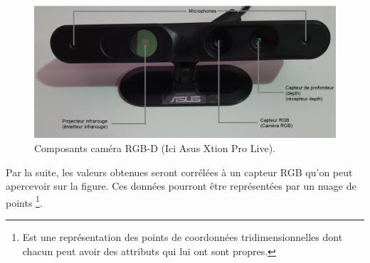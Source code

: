 \documentclass[a4paper, 12pt]{book}
\begin{document}
\begin{figure}[htbp]
  \hspace{-0.75cm}
 \includegraphics[scale=0.50]{images/Asus.png} \hspace{2cm}
  \caption{Composants caméra RGB-D (Ici Asus Xtion Pro Live).\label{fig-Asus}}
\end{figure}

Par la suite, les valeurs obtenues seront corrélées à un capteur RGB qu'on peut apercevoir sur la figure. Ces données pourront être représentées par un nuage de points \footnote{Est une représentation des points de coordonnées tridimensionnelles dont chacun peut avoir des attributs qui lui ont sont propres.}.
\end{document}

